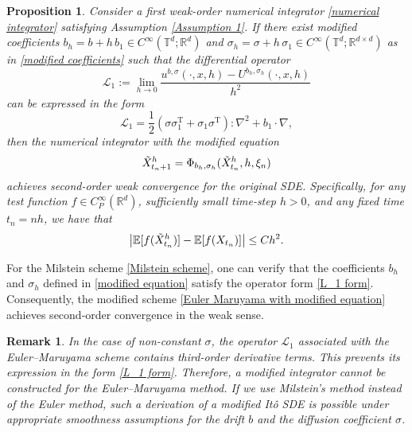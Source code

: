 \documentclass[12pt,a4paper,reqno]{amsart}
\newtheorem{remark}{Remark}[section]
\newtheorem{proposition}{Proposition}[section]
\numberwithin{equation}{section}
\begin{document}
\begin{proposition}\label{Prop: order two}
    Consider a first weak-order numerical integrator \eqref{numerical integrator} satisfying Assumption \ref{Assumption 1}. If there exist modified coefficients $b_{h} = b + h\,b_1 \in C^{\infty}(\mathbb{T}^d;\mathbb{R}^d)$ and $\sigma_{h} = \sigma + h\,\sigma_1\in C^{\infty}(\mathbb{T}^d;\mathbb{R}^{d\times d})$ as in \eqref{modified coefficients} such that the differential operator 
    \begin{equation*}
        \mathcal{L}_{1} := \lim_{h \to 0}\frac{u^{b,\sigma}(\cdot,x,h)- U^{b_h,\sigma_h}(\cdot,x,h)}{h^2}
    \end{equation*}
    can be expressed in the form
    \begin{equation}\label{L_1 form}
        \mathcal{L}_1 =  \frac{1}{2}(\sigma \sigma_1^{\mathrm{T}} +\sigma_1 \sigma^{\mathrm{T}}):\nabla^2 + b_1\cdot \nabla,
    \end{equation}
    then the numerical integrator with the modified equation
    \begin{equation}\label{numerical integrator with modifeid equation}
        \Tilde{X}^h_{t_n+1} = \Phi_{b_h,\sigma_h}(\Tilde{X}^h_{t_n},h,\xi_n)
    \end{equation}
   achieves second-order weak convergence for the original SDE. Specifically, for any test function $f\in C_P^{\infty}(\mathbb{R}^d)$,  sufficiently small time-step $h>0$, and any fixed time $t_n =nh$, we have that
    \begin{equation*}
        \left|\mathbb{E}[f(\Tilde{X}^h_{t_n})] - \mathbb{E}[f(X_{t_n})]\right| \le C h^{2}.
    \end{equation*}
\end{proposition}

For the Milstein scheme \eqref{Milstein scheme}, one can verify that the coefficients $b_h$ and $\sigma_h$ defined in \eqref{modified equation} satisfy the operator form \eqref{L_1 form}. Consequently, the modified scheme \eqref{Euler Maruyama with modified equation} achieves second-order convergence in the weak sense.

\begin{remark}
   In the case of non-constant $\sigma$, the operator $\mathcal{L}_1$ associated with the Euler--Maruyama scheme contains third-order derivative terms. This prevents its expression in the form \eqref{L_1 form}. Therefore, a modified integrator cannot be constructed for the Euler--Maruyama method. If we use Milstein’s method instead of the Euler method, such a derivation
of a modified It\^{o} SDE is possible under appropriate smoothness assumptions for the drift $b$ and the diffusion coefficient $\sigma$.
\end{remark}
\end{document}
